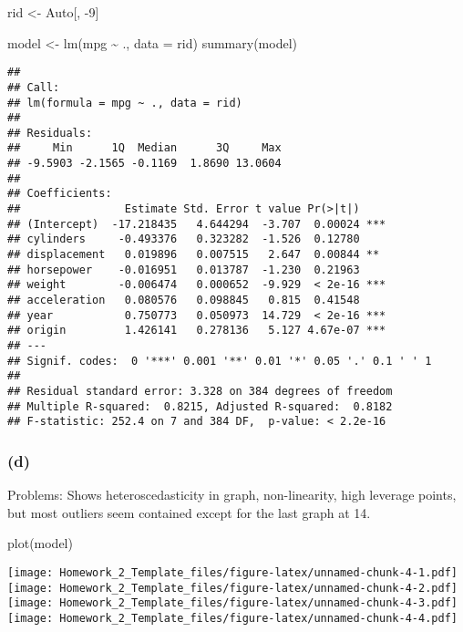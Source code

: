 \documentclass[
]{article}
\newenvironment{Shaded}{\begin{snugshade}}{\end{snugshade}}
\newcommand{\AttributeTok}[1]{\textcolor[rgb]{0.77,0.63,0.00}{#1}}
\newcommand{\DecValTok}[1]{\textcolor[rgb]{0.00,0.00,0.81}{#1}}
\newcommand{\FunctionTok}[1]{\textcolor[rgb]{0.00,0.00,0.00}{#1}}
\newcommand{\NormalTok}[1]{#1}
\newcommand{\OtherTok}[1]{\textcolor[rgb]{0.56,0.35,0.01}{#1}}
\newcommand{\SpecialCharTok}[1]{\textcolor[rgb]{0.00,0.00,0.00}{#1}}
\begin{document}
\begin{Shaded}
\begin{Highlighting}[]
\NormalTok{rid }\OtherTok{\textless{}{-}}\NormalTok{ Auto[, }\SpecialCharTok{{-}}\DecValTok{9}\NormalTok{]}


\NormalTok{model }\OtherTok{\textless{}{-}} \FunctionTok{lm}\NormalTok{(mpg }\SpecialCharTok{\textasciitilde{}}\NormalTok{ .,  }\AttributeTok{data =}\NormalTok{ rid)}
\FunctionTok{summary}\NormalTok{(model)}
\end{Highlighting}
\end{Shaded}

\begin{verbatim}
## 
## Call:
## lm(formula = mpg ~ ., data = rid)
## 
## Residuals:
##     Min      1Q  Median      3Q     Max 
## -9.5903 -2.1565 -0.1169  1.8690 13.0604 
## 
## Coefficients:
##                Estimate Std. Error t value Pr(>|t|)    
## (Intercept)  -17.218435   4.644294  -3.707  0.00024 ***
## cylinders     -0.493376   0.323282  -1.526  0.12780    
## displacement   0.019896   0.007515   2.647  0.00844 ** 
## horsepower    -0.016951   0.013787  -1.230  0.21963    
## weight        -0.006474   0.000652  -9.929  < 2e-16 ***
## acceleration   0.080576   0.098845   0.815  0.41548    
## year           0.750773   0.050973  14.729  < 2e-16 ***
## origin         1.426141   0.278136   5.127 4.67e-07 ***
## ---
## Signif. codes:  0 '***' 0.001 '**' 0.01 '*' 0.05 '.' 0.1 ' ' 1
## 
## Residual standard error: 3.328 on 384 degrees of freedom
## Multiple R-squared:  0.8215, Adjusted R-squared:  0.8182 
## F-statistic: 252.4 on 7 and 384 DF,  p-value: < 2.2e-16
\end{verbatim}

\hypertarget{d}{%
\subsubsection{(d)}\label{d}}

Problems: Shows heteroscedasticity in graph, non-linearity, high
leverage points, but most outliers seem contained except for the last
graph at 14.

\begin{Shaded}
\begin{Highlighting}[]
\FunctionTok{plot}\NormalTok{(model)}
\end{Highlighting}
\end{Shaded}

\texttt{[image: Homework\_2\_Template\_files/figure-latex/unnamed-chunk-4-1.pdf]}
\texttt{[image: Homework\_2\_Template\_files/figure-latex/unnamed-chunk-4-2.pdf]}
\texttt{[image: Homework\_2\_Template\_files/figure-latex/unnamed-chunk-4-3.pdf]}
\texttt{[image: Homework\_2\_Template\_files/figure-latex/unnamed-chunk-4-4.pdf]}
\end{document}
